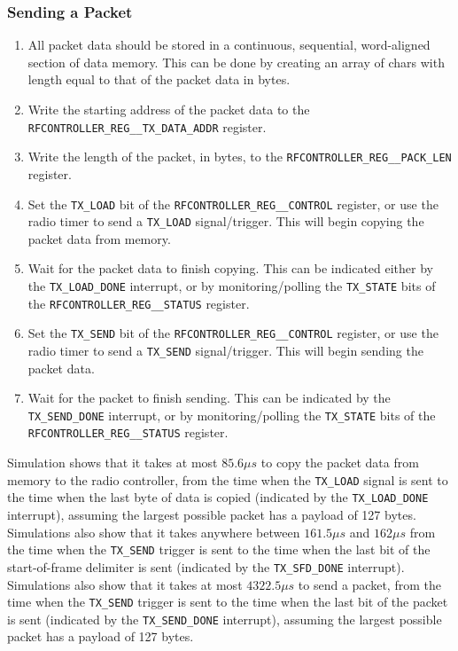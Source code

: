 \subsubsection{Sending a Packet}

\begin{enumerate}
	\item All packet data should be stored in a continuous, sequential, word-aligned section of data memory. This can be done by creating an array of chars with length equal to that of the packet data in bytes.
	\item Write the starting address of the packet data to the \texttt{RFCONTROLLER\_REG\_\_TX\_D\-A\-T\-A\_ADDR} register.
	\item Write the length of the packet, in bytes, to the \texttt{RFCONTROLLER\_REG\_\_PACK\_LEN} register.
	\item Set the \texttt{TX\_LOAD} bit of the \texttt{RFCONTROLLER\_REG\_\_CONTROL} register, or use the radio timer to send a \texttt{TX\_LOAD} signal/trigger. This will begin copying the packet data from memory.
	\item Wait for the packet data to finish copying. This can be indicated either by the \texttt{TX\_LOAD\_DONE} interrupt, or by monitoring/polling the \texttt{TX\_STATE} bits of the \texttt{RFCONTROLLER\_REG\_\_STATUS} register.
	\item Set the \texttt{TX\_SEND} bit of the \texttt{RFCONTROLLER\_REG\_\_CONTROL} register, or use the radio timer to send a \texttt{TX\_SEND} signal/trigger. This will begin sending the packet data.
	\item Wait for the packet to finish sending. This can be indicated by the \texttt{TX\_SEND\-\_DONE} interrupt, or by monitoring/polling the \texttt{TX\_STATE} bits of the \texttt{RFCONTRO\-L\-L\-ER\_REG\_\_STATUS} register.
\end{enumerate}

Simulation shows that it takes at most $85.6\mu s$ to copy the packet data from memory to the radio controller, from the time when the \texttt{TX\_LOAD} signal is sent to the time when the last byte of data is copied (indicated by the \texttt{TX\_LOAD\_DONE} interrupt), assuming the largest possible packet has a payload of 127 bytes. Simulations also show that it takes anywhere between $161.5\mu s$ and $162\mu s$ from the time when the \texttt{TX\_SEND} trigger is sent to the time when the last bit of the start-of-frame delimiter is sent (indicated by the \texttt{TX\_SFD\_DONE} interrupt). Simulations also show that it takes at most $4322.5\mu s$ to send a packet, from the time when the \texttt{TX\_SEND} trigger is sent to the time when the last bit of the packet is sent (indicated by the \texttt{TX\_SEND\_DONE} interrupt), assuming the largest possible packet has a payload of 127 bytes.

